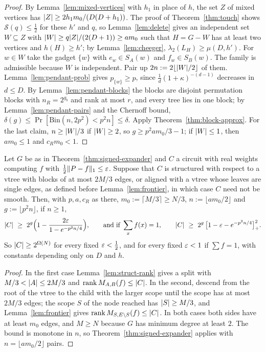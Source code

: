 \begin{proof}
By Lemma~\ref{lem:mixed-vertices} with $h_1$ in place of $h$, the set $Z$ of mixed vertices has $\lvert Z\rvert\ge2h_1m_0/(D(D+h_1))$. The proof of Theorem~\ref{thm:touch} shows $\mathcal S(q)\le\frac12$ for these $h'$ and $q$, so Lemma~\ref{lem:delete} gives an independent set $W\subseteq Z$ with $\lvert W\rvert\ge q\lvert Z\rvert/(2(D+1))\ge am_0$ such that $H=G-W$ has at least two vertices and $h(H)\ge h'$; by Lemma~\ref{lem:cheeger}, $\lambda_2(L_H)\ge\mu(D,h')$. For $w\in W$ take the gadget $\{w\}$ with $e_w\in S_A(w)$ and $f_w\in S_B(w)$. The family is admissible because $W$ is independent. Pair up $2n:=2\lfloor\lvert W\rvert/2\rfloor$ of them. Lemma~\ref{lem:pendant-prob} gives $p_{\{w\}}\ge p$, since $\frac1d(1+\kappa)^{-(d-1)}$ decreases in $d\le D$. By Lemma~\ref{lem:pendant-blocks} the blocks are disjoint permutation blocks with $n_R=2^{g_b}$ and rank at most $r$, and every tree lies in one block; by Lemma~\ref{lem:pendant-pairs} and the Chernoff bound, $\delta(g)\le\Pr[\mathrm{Bin}(n,2p^2)<p^2n]\le\delta$. Apply Theorem~\ref{thm:block-approx}. For the last claim, $n\ge\lvert W\rvert/3$ if $\lvert W\rvert\ge2$, so $g\ge p^2am_0/3-1$; if $\lvert W\rvert\le1$, then $am_0\le1$ and $c_Rm_0<1$.
\end{proof}

\begin{corollary}\label{cor:signed-expander}
Let $G$ be as in Theorem~\ref{thm:signed-expander} and $C$ a circuit with real weights computing $f$ with $\frac12\lVert P-f\rVert_1\le\varepsilon$. Suppose that $C$ is structured with respect to a vtree with blocks of at most $2M/3$ edges, or aligned with a vtree whose leaves are single edges, as defined before Lemma~\ref{lem:frontier}, in which case $C$ need not be smooth. Then, with $p,a,c_R$ as there, $m_0:=\lceil M/3\rceil\ge N/3$, $n:=\lfloor am_0/2\rfloor$ and $g:=\lfloor p^2n\rfloor$, if $n\ge1$,
\[
  \abs C\ \ge\ 2^g\Bigl(1-\frac{2\eps}{1-e^{-p^2n/4}}\Bigr),\qquad\text{and if }\sum_xf(x)=1,\qquad\abs C\ \ge\ 2^g\,\bigl[1-\eps-e^{-p^2n/4}\bigr]_+^2 .
\]
So $\lvert C\rvert\ge2^{\Omega(N)}$ for every fixed $\varepsilon<\frac12$, and for every fixed $\varepsilon<1$ if $\sum f=1$, with constants depending only on $D$ and $h$.
\end{corollary}

\begin{proof}
In the first case Lemma~\ref{lem:struct-rank} gives a split with $M/3<\lvert A\rvert\le2M/3$ and $\operatorname{rank}M_{A,B}(f)\le\lvert C\rvert$. In the second, descend from the root of the vtree to the child with the larger scope until the scope has at most $2M/3$ edges; the scope $S$ of the node reached has $\lvert S\rvert\ge M/3$, and Lemma~\ref{lem:frontier} gives $\operatorname{rank}M_{S,E\setminus S}(f)\le\lvert C\rvert$. In both cases both sides have at least $m_0$ edges, and $M\ge N$ because $G$ has minimum degree at least $2$. The bound is monotone in $n$, so Theorem~\ref{thm:signed-expander} applies with $n=\lfloor am_0/2\rfloor$ pairs.
\end{proof}

